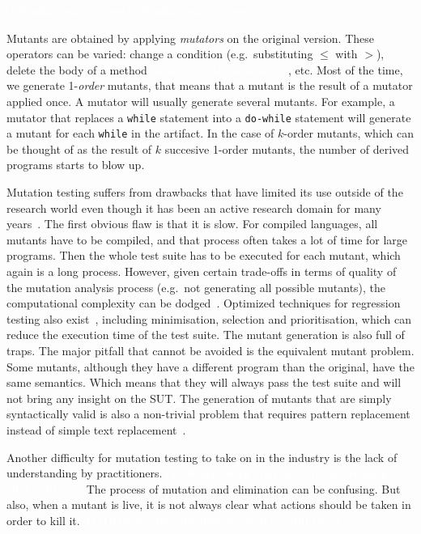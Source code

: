 \documentclass[11pt]{sdm_internship}
\newcommand{\addref}[1]{\colorbox{TealBlue!100}{\textcolor{white}{\textbf{$[$\ifx&#1&\ \else#1\fi$]$}}}}
\newcommand{\todo}[1]{\colorbox{Red!75}{\textcolor{white}{\textbf{TODO\ifx&#1&\else: #1\fi}}}}
\theoremstyle{definition}
\begin{document}
\addref{fundational papers}

Mutants are obtained by applying \emph{mutators} on the original version.
These operators can be varied: change a condition (e.g.\ substituting $\leq$ with $>$), delete the body of a method \addref{descartes}, etc.
Most of the time, we generate 1-\emph{order} mutants, that means that a mutant is the result of a mutator applied once.
A mutator will usually generate several mutants.
For example, a mutator that replaces a \texttt{while} statement into a \texttt{do-while} statement will generate a mutant for each \texttt{while} in the artifact.
In the case of $k$-order mutants, which can be thought of as the result of $k$ succesive 1-order mutants\cite{wah2000theoretical}, the number of derived programs starts to blow up.

Mutation testing suffers from drawbacks that have limited its use outside of the research world even though it has been an active research domain for many years~\cite{jia2011analysis}.
The first obvious flaw is that it is slow.
For compiled languages, all mutants have to be compiled, and that process often takes a lot of time for large programs.
Then the whole test suite has to be executed for each mutant, which again is a long process.
However, given certain trade-offs in terms of quality of the mutation analysis process (e.g.\ not generating all possible mutants), the computational complexity can be dodged~\cite{offutt1993experimental,movzucha2016mutation}.
Optimized techniques for regression testing also exist~\cite{yoo2012regression}, including minimisation, selection and prioritisation, which can reduce the execution time of the test suite.
The mutant generation is also full of traps.
The major pitfall that cannot be avoided is the equivalent mutant problem.
Some mutants, although they have a different program than the original, have the same semantics.
Which means that they will always pass the test suite and will not bring any insight on the SUT\@.
The generation of mutants that are simply syntactically valid is also a non-trivial problem that requires pattern replacement instead of simple text replacement~\cite{simao2009transformational}.

Another difficulty for mutation testing to take on in the industry is the lack of understanding by practitioners.\todo{rework that sentence}
The process of mutation and elimination can be confusing.
But also, when a mutant is live, it is not always clear what actions should be taken in order to kill it.
\todo{maybe add more}
\end{document}
